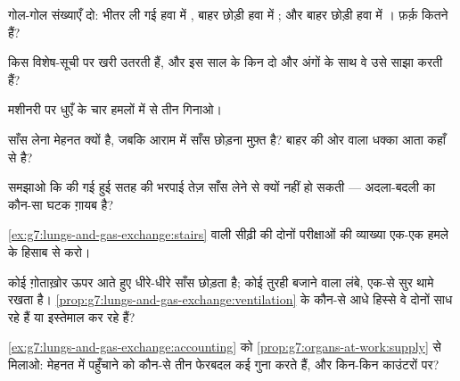 \begin{exercise}[$\star$]\label{exo:g7:lungs-and-gas-exchange:4}
गोल-गोल संख्याएँ दो: भीतर ली गई हवा में , बाहर छोड़ी हवा में
; और बाहर छोड़ी हवा में । फ़र्क़ कितने हैं?
\end{exercise}

\begin{exercise}[$\star$]\label{exo:g7:lungs-and-gas-exchange:5}
 किस विशेष-सूची पर खरी उतरती हैं, और इस साल के किन दो और अंगों
के साथ वे उसे साझा करती हैं?
\end{exercise}

\begin{exercise}[$\star$]\label{exo:g7:lungs-and-gas-exchange:6}
मशीनरी पर धुएँ के चार हमलों में से तीन गिनाओ।
\end{exercise}

\begin{exercise}[$\star\star$]\label{exo:g7:lungs-and-gas-exchange:7}
साँस लेना मेहनत क्यों है, जबकि आराम में साँस छोड़ना मुफ़्त है? बाहर की
ओर वाला धक्का आता कहाँ से है?
\end{exercise}

\begin{exercise}[$\star\star$]\label{exo:g7:lungs-and-gas-exchange:8}
समझाओ कि  की गई हुई सतह की भरपाई तेज़ साँस लेने से क्यों नहीं
हो सकती --- अदला-बदली का कौन-सा घटक ग़ायब है?
\end{exercise}

\begin{exercise}[$\star\star$]\label{exo:g7:lungs-and-gas-exchange:9}
\cref{ex:g7:lungs-and-gas-exchange:stairs} वाली सीढ़ी की दोनों
परीक्षाओं की व्याख्या एक-एक हमले के हिसाब से करो।
\end{exercise}

\begin{exercise}[$\star\star$]\label{exo:g7:lungs-and-gas-exchange:10}
कोई ग़ोताख़ोर ऊपर आते हुए धीरे-धीरे साँस छोड़ता है; कोई तुरही बजाने
वाला लंबे, एक-से सुर थामे रखता है।
\cref{prop:g7:lungs-and-gas-exchange:ventilation} के कौन-से आधे हिस्से
वे दोनों साध रहे हैं या इस्तेमाल कर रहे हैं?
\end{exercise}

\begin{exercise}[$\star\star$]\label{exo:g7:lungs-and-gas-exchange:11}
\cref{ex:g7:lungs-and-gas-exchange:accounting} को
\cref{prop:g7:organs-at-work:supply} से मिलाओ: मेहनत में पहुँचाने को
कौन-से तीन फेरबदल कई गुना करते हैं, और किन-किन काउंटरों पर?
\end{exercise}


